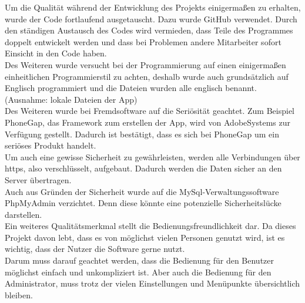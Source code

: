 Um die Qualität während der Entwicklung des Projekts einigermaßen zu erhalten, wurde der Code fortlaufend ausgetauscht. Dazu wurde GitHub verwendet. Durch den ständigen Austausch des Codes wird vermieden, dass Teile des Programmes doppelt entwickelt werden und dass bei Problemen andere Mitarbeiter sofort Einsicht in den Code haben.\\

Des Weiteren wurde versucht bei der Programmierung auf einen einigermaßen einheitlichen Programmierstil zu achten, deshalb wurde auch grundsätzlich auf Englisch programmiert und die Dateien wurden alle englisch benannt. (Ausnahme: lokale Dateien der App)\\

Des Weiteren wurde bei Fremdsoftware auf die Seriösität geachtet. Zum Beispiel PhoneGap, das Framework zum erstellen der App, wird von AdobeSystems zur Verfügung gestellt. Dadurch ist bestätigt, dass es sich bei PhoneGap um ein seriöses Produkt handelt.\\

Um auch eine gewisse Sicherheit zu gewährleisten, werden alle Verbindungen über https, also verschlüsselt, aufgebaut. Dadurch werden die Daten sicher an den Server übertragen.\\

Auch aus Gründen der Sicherheit wurde auf die MySql-Verwaltungssoftware PhpMyAdmin verzichtet. Denn diese könnte eine potenzielle Sicherheitslücke darstellen.\\


Ein weiteres Qualitätsmerkmal stellt die Bedienungsfreundlichkeit dar. Da dieses Projekt davon lebt, dass es von möglichst vielen Personen genutzt wird, ist es wichtig, dass der Nutzer die Software gerne nutzt.\\
Darum muss darauf geachtet werden, dass die Bedienung für den Benutzer möglichst einfach und unkompliziert ist.
Aber auch die Bedienung für den Administrator, muss trotz der vielen Einstellungen und Menüpunkte übersichtlich bleiben.\\
 
